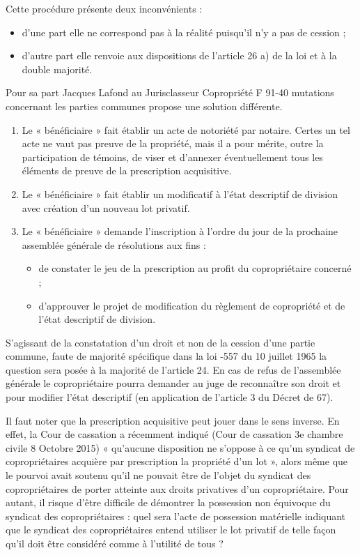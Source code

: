 	Cette procédure présente deux inconvénients :
	\begin{itemize}
		\item d’une part elle ne correspond pas à la réalité puisqu’il n’y a pas de cession ;
		\item d’autre part elle renvoie aux dispositions de l’article 26 a) de la loi et à la double majorité.
	\end{itemize}
	
	Pour sa part Jacques Lafond au Jurisclasseur Copropriété F 91-40 mutations concernant les parties
	communes propose une solution différente.
	\begin{enumerate}
		\item  Le « bénéficiaire » fait établir un acte de notoriété par notaire. Certes un tel acte ne vaut pas preuve
		de la propriété, mais il a pour mérite, outre la participation de témoins, de viser et d’annexer
		éventuellement tous les éléments de preuve de la prescription acquisitive.
		\item Le « bénéficiaire » fait établir un modificatif à l’état descriptif de division avec création d’un nouveau
		lot privatif.
		\item Le « bénéficiaire » demande l’inscription à l’ordre du jour de la prochaine assemblée générale de
		résolutions aux fins :
		\begin{itemize}
			\item de constater le jeu de la prescription au profit du copropriétaire concerné ;
			\item  d'approuver le projet de modification du règlement de copropriété et de l'état descriptif de division.
		\end{itemize}
	\end{enumerate}
	
	S’agissant de la constatation d’un droit et non de la cession d’une partie commune, faute de majorité
	spécifique dans la loi -557 du 10 juillet 1965 la question sera posée à la majorité de l’article 24. En cas
	de refus de l’assemblée générale le copropriétaire pourra demander au juge de reconnaître son droit et
	pour modifier l’état descriptif (en application de l’article 3 du Décret de 67).
	
	Il faut noter que la prescription acquisitive peut jouer dans le sens inverse. En effet, la Cour de cassation a
	récemment indiqué (Cour de cassation 3e chambre civile 8 Octobre 2015) « qu'aucune disposition ne
	s'oppose à ce qu'un syndicat de copropriétaires acquière par prescription la propriété d'un lot », alors
	même que le pourvoi avait soutenu qu’il ne pouvait être de l’objet du syndicat des copropriétaires de
	porter atteinte aux droits privatives d’un copropriétaire. Pour autant, il risque d’être difficile de démontrer
	la possession non équivoque du syndicat des copropriétaires : quel sera l’acte de possession matérielle
	indiquant que le syndicat des copropriétaires entend utiliser le lot privatif de telle façon qu’il doit être
	considéré comme à l’utilité de tous ?
